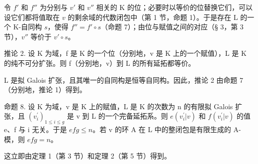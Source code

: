 令 \(f'\) 和 \(f''\) 为分别与 \(v'\) 和 \(v''\) 相关的 K 的位；必要时以等价的位替换它们，可以设它们都将值取在 \(v\) 的剩余域的代数闭包中（第 1 节，命题 1）。于是存在 L 的一个 K-自同构 \(s\)，使得 \(f'' = f' \circ s\)（命题 7）；由位与赋值之间的对应（§ 3，第 3 节），\(v''\) 等价于 \(v' \circ s\)。

推论 2. 设 K 为域，f 是 K 的一个位（分别地，v 是 K 上的一个赋值），L 是 K 的纯不可分扩张。则 f（分别地，v）到 L 的所有延拓都等价。

L 是拟 Galois 扩张，且其唯一的自同构是恒等自同构。因此，推论 2 由命题 7（分别地，推论 1）得到。

命题 8. 设 K 为域，v 是 K 上的赋值，L 是 K 的次数为 n 的有限拟 Galois 扩张，且 \((v_{i}^{\prime})_{1\leq i\leq g}\) 是 v 到 L 的一个完备延拓系。则 \(e(v_{i}^{\prime}|v)\) 和 \(f(v_{i}^{\prime}|v)\) 的值 e、f 与 i 无关。于是 \(efg \leqslant n\)。若 v 的环 A 在 L 中的整闭包是有限生成的 A-模，则 \(efg = n\)。

这立即由定理 1（第 3 节）和定理 2（第 5 节）得到。

